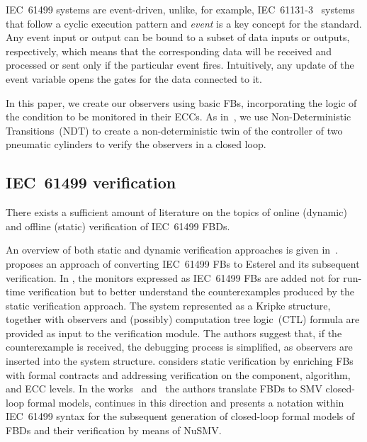 \begin{bibunit}
IEC~61499 systems are event-driven, unlike, for example, \mbox{IEC~61131-3}~\cite{tiegelkamp1995iec} systems that follow a cyclic execution pattern and \emph{event} is a key concept for the standard. Any event input or output can be bound to a subset of data inputs or outputs, respectively, which means that the corresponding data will be received and processed or sent only if the particular event fires. Intuitively, any update of the event variable opens the gates for the data connected to it.

In this paper, we create our observers using basic FBs, incorporating the logic of the condition to be monitored in their ECCs. As in~\cite{toolchain}, we use Non-Deterministic Transitions~(NDT) to create a non-deterministic twin of the controller of two pneumatic cylinders to verify the observers in a closed loop.



\subsection{IEC~61499 verification}
There exists a sufficient amount of literature on the topics of online (dynamic) and offline (static) verification of IEC~61499 FBDs. 

An overview of both static and dynamic verification approaches is given in~\cite{15blech2016comparison}.
\cite{12yoong2010verifying} proposes an approach of converting IEC~61499 FBs to Esterel and its subsequent verification.
In \cite{13yoong2015verification,14bhatti2011observer}, the monitors expressed as IEC~61499 FBs are added not for run-time verification but to better understand the counterexamples produced by the static verification approach. The system represented as a Kripke structure, together with observers and (possibly) computation tree logic~(CTL) formula are provided as input to the verification module. The authors suggest that, if the counterexample is received, the debugging process is simplified, as observers are inserted into the system structure.
\cite{11lindgren2016contract} considers static verification by enriching FBs with formal contracts and addressing verification on the component, algorithm, and ECC levels. In the works~\cite{agn_case_study} and~\cite{agnostic} the authors translate FBDs to SMV closed-loop formal models, \cite{toolchain} continues in this direction and presents a notation within IEC~61499 syntax for the subsequent generation of closed-loop formal models of FBDs and their verification by means of NuSMV. 



\end{bibunit}

